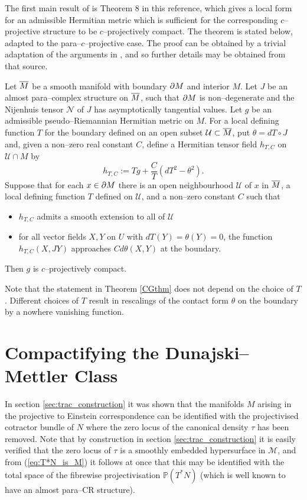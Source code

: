The first main result of \cite{CG} is  Theorem 8 in this reference, which gives a local form for an admissible Hermitian metric which is sufficient for the corresponding $c$--projective structure to be $c$--projectively compact. The theorem is stated below, adapted to the para--$c$--projective case. The proof can be obtained by a trivial adaptation of the arguments in
\cite{CG}, and so further details may be obtained from that source.
\begin{theo}[\cite{CG}] \label{CGthm}
Let $\overline{M}$ be a smooth manifold with boundary $\partial M$ and interior $M$. Let $J$ be an almost para--complex structure on $\overline{M}$, such that $\partial M$ is non--degenerate and the Nijenhuis tensor $\mathcal{N}$ of $J$ has asymptotically tangential values. Let $g$ be an admissible pseudo--Riemannian Hermitian metric on $M$. For a local defining function $T$ for the boundary defined on an open 
subset ${\mathcal U}\subset \overline{M}$, put $\theta=dT\circ J$ and, given a non--zero real 
constant $C$, define a Hermitian tensor field $h_{T,C}$ on 
${\mathcal U}\cap M$ by
\[
h_{T,C}:=Tg+\frac{C}{T}(dT^2-\theta^2).
\]
Suppose that for each $x\in\partial M$ there is an open neighbourhood 
${\mathcal{U}}$ of $x$ in $\overline{M}$, a local defining function $T$ defined on 
${\mathcal{U}}$, and a non--zero constant $C$ such that
\begin{itemize}
\item $h_{T,C}$ admits a smooth extension to all of $\mathcal{U}$
\item for all vector fields $X,Y$ on $U$ with $dT(Y)=\theta(Y)=0$, the function $h_{T,C}(X,JY)$ approaches $Cd\theta(X,Y)$ at the boundary.
\end{itemize}
Then $g$ is $c$--projectively compact.
\end{theo}
Note that the statement in  Theorem \ref{CGthm} does not depend on the choice of $T$. Different choices of $T$ result in rescalings of the contact form $\theta$ on the boundary by a nowhere vanishing function.


\section{Compactifying the Dunajski--Mettler Class} 

In section \ref{sec:trac_construction} it was shown that the manifolds $M$ arising in the projective to Einstein correspondence can be identified with the projectivised cotractor bundle of $N$ where the zero locus of the canonical density $\tau$ has been removed. Note that by construction in section \ref{sec:trac_construction} it is easily verified that the zero locus of $\tau$ is a smoothly embedded hypersurface in $\mathcal{M}$,  and from (\ref{eq:T*N_is_M}) it follows at once that this may be identified with the total space of the fibrewise projectivisation $\mathbb{P}(T^*N)$ (which is well known to have an almost para--CR structure). 

